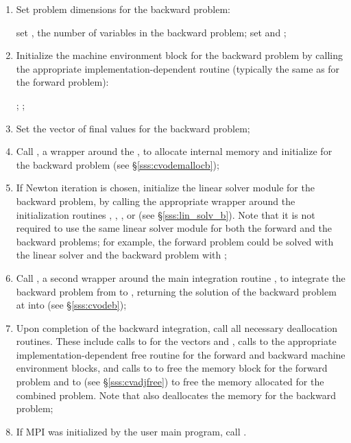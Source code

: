 \begin{enumerate}
\item \label{i:back_start}
  Set problem dimensions for the backward problem:

  {\s} set , the number of variables in the backward problem;
  {\p} set  and ;

\item
  Initialize the machine environment block for the backward problem by calling 
  the appropriate implementation-dependent {\nvector} routine
  (typically the same as for the forward problem):
  
  {\s} ; {\p} ;

\item
  Set the vector  of final values for the backward problem;

\item
  Call , a wrapper around the , to 
  allocate internal memory and initialize {\cvodes} for the backward problem
  (see \S\ref{sss:cvodemallocb});


\item \label{i:lin_solverB}
  If Newton iteration is chosen, initialize the linear solver module 
  for the backward problem, by calling the appropriate wrapper around 
  the initialization routines , , ,
  or  (see \S\ref{sss:lin_solv_b}). Note that it is not required
  to use the same linear solver module for both the forward and the 
  backward problems; for example, the forward problem could be solved
  with the {\cvdense} linear solver and the backward problem with {\cvspgmr};

\item \label{i:back_end}
  Call , a second wrapper around the {\cvodes} main integration
  routine , to integrate the backward problem from 
  to , returning the solution of the backward problem at  into
   (see \S\ref{sss:cvodeb});

\item
  Upon completion of the backward integration, call all necessary deallocation
  routines. These include calls to  for the vectors  and ,
  calls to the appropriate implementation-dependent {\nvector} free routine for
  the forward and backward machine environment blocks, and calls to 
  to free the {\cvodes} memory block for the forward problem and to
   (see \S\ref{sss:cvadjfree}) to free the memory allocated for the 
  combined problem. Note that  also deallocates the {\cvodes} memory 
  for the backward problem;

\item
  {\p} If MPI was initialized by the user main program, call .

\end{enumerate}

